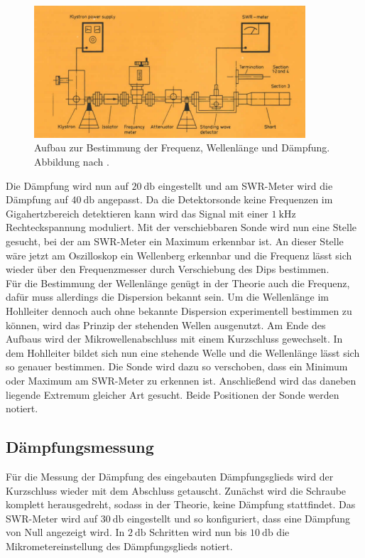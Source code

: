 \begin{figure}
    \centering
    \includegraphics[width=0.9\textwidth]{bilder/aufbau2.png}
    \caption{Aufbau zur Bestimmung der Frequenz, Wellenlänge und Dämpfung. Abbildung nach \cite{skript}.} 
    \label{fig:2}
\end{figure}
Die Dämpfung wird nun auf $\SI{20}{\decibel}$ eingestellt und am SWR-Meter wird die Dämpfung auf $\SI{40}{\decibel}$ angepasst. Da die Detektorsonde keine Frequenzen im Gigahertzbereich detektieren kann wird das Signal mit einer $\SI{1}{\kilo\hertz}$ Rechteckspannung
moduliert. Mit der verschiebbaren Sonde wird nun eine Stelle gesucht, bei der am SWR-Meter ein Maximum erkennbar ist. An dieser Stelle wäre jetzt am Oszilloskop ein Wellenberg erkennbar und die Frequenz lässt sich wieder über den Frequenzmesser
durch Verschiebung des Dips bestimmen.
\\
\newline
Für die Bestimmung der Wellenlänge genügt in der Theorie auch die Frequenz, dafür muss allerdings die Dispersion bekannt sein. Um die Wellenlänge im Hohlleiter dennoch auch ohne bekannte Dispersion
experimentell bestimmen zu können, wird das Prinzip der stehenden Wellen ausgenutzt. Am Ende des Aufbaus wird der Mikrowellenabschluss mit einem Kurzschluss gewechselt. In dem Hohlleiter bildet sich nun eine stehende Welle
und die Wellenlänge lässt sich so genauer bestimmen.
Die Sonde wird dazu so verschoben, dass ein Minimum oder Maximum am SWR-Meter zu erkennen ist. Anschließend wird das daneben liegende Extremum gleicher Art gesucht. Beide Positionen der Sonde werden notiert.

\subsection{Dämpfungsmessung}
Für die Messung der Dämpfung des eingebauten Dämpfungsglieds wird der Kurzschluss wieder mit dem Abschluss getauscht. Zunächst wird die Schraube komplett herausgedreht, sodass in der Theorie, keine Dämpfung stattfindet. Das SWR-Meter wird auf 
$\SI{30}{\decibel}$ eingestellt und
so konfiguriert, dass eine Dämpfung von Null angezeigt wird. In $\SI{2}{\decibel}$ Schritten wird nun bis $\SI{10}{\decibel}$ die Mikrometereinstellung des Dämpfungsglieds notiert.

